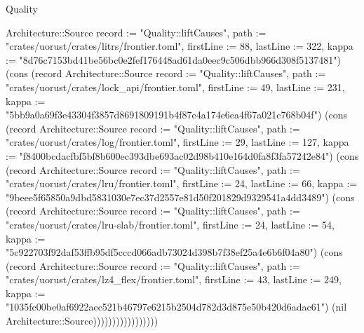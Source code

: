\begin{lexlean}{Quality}
\begin{semanticmodule}
{Architecture::Source {record := "Quality::liftCauses", path := "crates/uorust/crates/litrs/frontier.toml", firstLine := 88, lastLine := 322, kappa := "8d76c7153bd41be56bc0e2fef176448ad61da0eec9c506dbb966d308f5137481"}) (cons (record Architecture::Source {record := "Quality::liftCauses", path := "crates/uorust/crates/lock_api/frontier.toml", firstLine := 49, lastLine := 231, kappa := "5bb9a0a69f3e43304f3857d8691809191b4f87e4a174e6ea4f67a021c768b04f"}) (cons (record Architecture::Source {record := "Quality::liftCauses", path := "crates/uorust/crates/log/frontier.toml", firstLine := 29, lastLine := 127, kappa := "f8400bcdacfbf5bf8b600ec393dbe693ac02d98b410e164d0fa8f3fa57242e84"}) (cons (record Architecture::Source {record := "Quality::liftCauses", path := "crates/uorust/crates/lru/frontier.toml", firstLine := 24, lastLine := 66, kappa := "9beee5f65850a9dbd5831030e7ec37d2557e81d50f201829d9329541a4dd3489"}) (cons (record Architecture::Source {record := "Quality::liftCauses", path := "crates/uorust/crates/lru-slab/frontier.toml", firstLine := 24, lastLine := 54, kappa := "5c922703f92daf53ffb95df5cccd066adb73024d398b7f38ef25a4e6b6f04a80"}) (cons (record Architecture::Source {record := "Quality::liftCauses", path := "crates/uorust/crates/lz4_flex/frontier.toml", firstLine := 43, lastLine := 249, kappa := "1035fc00be0af6922aec521b46797e6215b2504d782d3d875e50b420d6adac61"}) (nil Architecture::Source)))))))))))))))))
}


\end{semanticmodule}
\end{lexlean}

